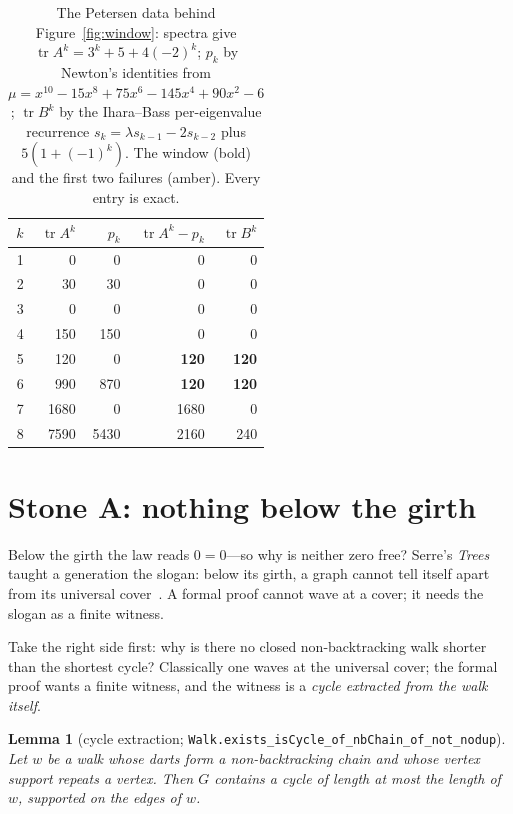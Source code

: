 \documentclass[11pt]{article}
\newtheorem{lemma}{Lemma}
\newcommand{\lean}[1]{\texttt{#1}}
\DeclareMathOperator{\tr}{tr}
\begin{document}
\begin{table}[h]
\centering\small
{}
\begin{tabular}{@{}rrrrr@{}}
\toprule
\rowcolor{ggteal!18} $k$ & $\tr A^k$ & $p_k$ & $\tr A^k - p_k$ & $\tr B^k$ \\
\midrule
1 & 0    & 0    & 0    & 0   \\
2 & 30   & 30   & 0    & 0   \\
3 & 0    & 0    & 0    & 0   \\
4 & 150  & 150  & 0    & 0   \\
5 & 120  & 0    & \textbf{120}  & \textbf{120} \\
6 & 990  & 870  & \textbf{120}  & \textbf{120} \\
7 & 1680 & 0    & {\color{ggamber}1680} & {\color{ggamber}0}   \\
8 & 7590 & 5430 & {\color{ggamber}2160} & {\color{ggamber}240} \\
\bottomrule
\end{tabular}
\caption{The Petersen data behind Figure~\ref{fig:window}: spectra give
$\tr A^k = 3^k + 5 + 4(-2)^k$; $p_k$ by Newton's identities from
$\mu = x^{10} - 15x^8 + 75x^6 - 145x^4 + 90x^2 - 6$; $\tr B^k$ by the Ihara--Bass
per-eigenvalue recurrence $s_k = \lambda s_{k-1} - 2 s_{k-2}$ plus $5(1 + (-1)^k)$. The
window (bold) and the first two failures (amber). Every entry is exact.}
\label{tab:petersen}
\end{table}

\section{Stone A: nothing below the girth}
\label{sec:stoneA}

Below the girth the law reads $0 = 0$---so why is neither zero free? Serre's \emph{Trees}
taught a generation the slogan: below its girth, a graph cannot tell itself apart from its
universal cover~\cite{Serre1980}. A formal proof cannot wave at a
cover; it needs the slogan as a finite witness.

Take the right side first: why is there no closed non-backtracking walk shorter than the
shortest cycle? Classically one waves
at the universal cover; the formal proof wants a finite witness, and the witness is a
\emph{cycle extracted from the walk itself}.

\begin{lemma}[cycle extraction; \lean{Walk.exists\_isCycle\_of\_nbChain\_of\_not\_nodup}]
\label{lem:crux}
Let $w$ be a walk whose darts form a non-backtracking chain and whose vertex support repeats
a vertex. Then $G$ contains a cycle of length at most the length of $w$, supported on the
edges of $w$.
\end{lemma}
\end{document}
